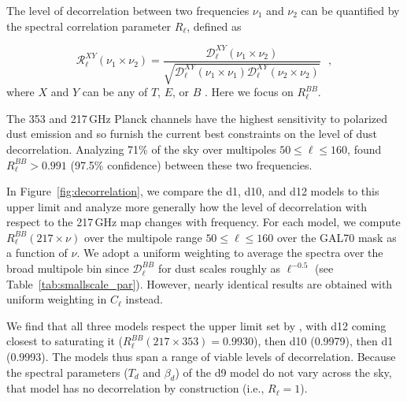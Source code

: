 \documentclass[twocolumn]{aastex631}
\begin{document}
The level of decorrelation between two frequencies $\nu_1$ and $\nu_2$ can be quantified by the spectral correlation parameter $R_\ell$, defined as

\begin{equation} \label{eq:R_ell}
    \mathcal{R}^{XY}_\ell(\nu_1\times\nu_2) = \frac{\mathcal{D}_\ell^{XY}(\nu_1\times\nu_2)}{\sqrt{\mathcal{D}_\ell^{XY}(\nu_1\times\nu_1)\mathcal{D}_\ell^{XY}(\nu_2\times\nu_2)}}
    ~~~,
\end{equation}
where $X$ and $Y$ can be any of $T$, $E$, or $B$ \citep{planck2016-L}. Here we focus on $R_\ell^{BB}$.

The 353 and 217\,GHz Planck channels have the highest sensitivity to polarized dust emission and so furnish the current best constraints on the level of dust decorrelation. Analyzing 71\% of the sky over multipoles $50 \leq \ell \leq 160$, \citet{planck2016-l11A} found $R_\ell^{BB} > 0.991$ (97.5\% confidence) between these two frequencies.

In Figure~\ref{fig:decorrelation}, we compare the d1, d10, and d12 models to this upper limit and analyze more generally how the level of decorrelation with respect to the 217\,GHz map changes with frequency. For each model, we compute $R_\ell^{BB}\left(217\times\nu\right)$ over the multipole range $50 \leq \ell \leq 160$ over the GAL70 mask as a function of $\nu$. We adopt a uniform weighting to average the spectra over the broad multipole bin since $\mathcal{D}_\ell^{BB}$ for dust scales roughly as $\ell^{-0.5}$ (see Table~\ref{tab:smallscale_par}). However, nearly identical results are obtained with uniform weighting in $C_\ell$ instead.

We find that all three models respect the upper limit set by \citet{planck2016-l11A}, with d12 coming closest to saturating it ($R_\ell^{BB}(217\times353) = 0.9930$), then d10 (0.9979), then d1 (0.9993). The models thus span a range of viable levels of decorrelation. Because the spectral parameters ($T_d$ and $\beta_d$) of the d9 model do not vary across the sky, that model has no decorrelation by construction (i.e., $R_\ell = 1$).
\end{document}
